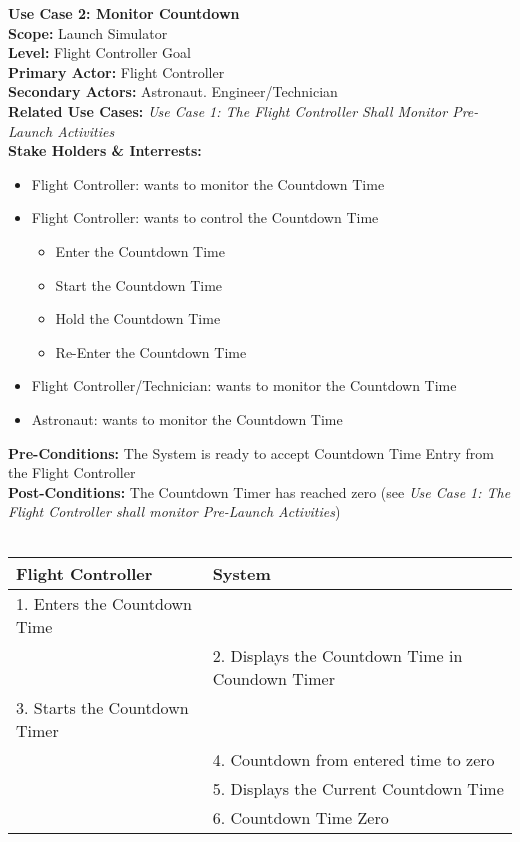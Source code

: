 \documentclass[letterpaper]{article}
\begin{document}
\noindent
\textbf{Use Case 2:  Monitor Countdown}\\
\textbf{Scope:  }Launch Simulator\\
\textbf{Level:  }Flight Controller Goal\\
\textbf{Primary Actor:  }Flight Controller\\
\textbf{Secondary Actors:  }Astronaut. Engineer/Technician\\
\textbf{Related Use Cases:  }\textit{Use Case 1:  The Flight Controller
Shall Monitor Pre-Launch Activities}\\
\textbf{Stake Holders \& Interrests:  }
\begin{itemize}
\item Flight Controller:  wants to monitor the Countdown Time
\item Flight Controller:  wants to control the Countdown Time
\begin{itemize}
\item Enter the Countdown Time
\item Start the Countdown Time
\item Hold the Countdown Time
\item Re-Enter the Countdown Time
\end{itemize}
\item Flight Controller/Technician:  wants to monitor the Countdown
Time
\item Astronaut:  wants to monitor the Countdown Time
\end{itemize}
\textbf{Pre-Conditions:  }The System is ready to accept Countdown Time
Entry from the Flight Controller\\
\textbf{Post-Conditions:  }The Countdown Timer has reached zero (see
\textit{Use Case 1:  The Flight Controller shall monitor Pre-Launch
Activities})\\\\
\begin{tabular}{|p{5.75cm}|p{5.75cm}|}\hline
\textbf{Flight Controller}&\textbf{System}\\\hline
1. Enters the Countdown Time&\\\hline
& 2. Displays the Countdown Time in Coundown Timer\\\hline
3.  Starts the Countdown Timer &\\\hline
& 4. Countdown from entered time to zero\\\hline
& 5. Displays the Current Countdown Time\\\hline
& 6. Countdown Time Zero\\\hline
\end{tabular}\\\\
\end{document}
